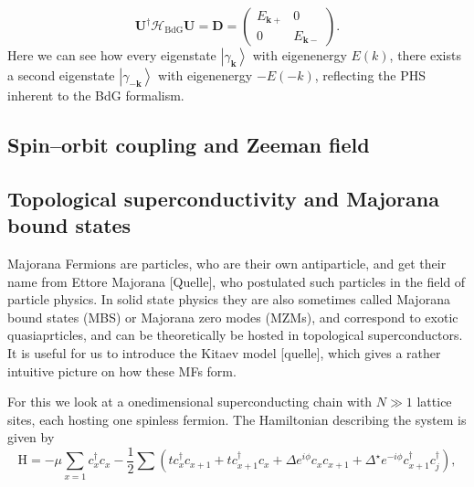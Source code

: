\begin{equation}
	\mathbf{U}^\dagger \mathcal{H}_\text{BdG} \mathbf{U} = \mathbf{D} = \scriptstyle{\begin{pmatrix} E_{\mathbf{k}+} & 0 \\ 0 & E_{\mathbf{k}-} \end{pmatrix}}.
	\label{eq:diagonal_bdg}
\end{equation}
Here we can see how every eigenstate $\left|\gamma_\mathbf{k} \right\rangle$ with eigenenergy $E(k)$, there exists a second eigenstate $\left| \gamma_{-\mathbf{k}} \right\rangle$ with eigenenergy $-E(-k)$, reflecting the PHS inherent to the BdG formalism. 

\subsection{Spin--orbit coupling and Zeeman field}
\label{sec:soc}

\subsection{Topological superconductivity and Majorana bound states}
\label{sec:topo}
Majorana Fermions are particles, who are their own antiparticle, and get their name from Ettore Majorana [Quelle], who postulated such particles in the field of particle physics. In solid state physics they are also sometimes called Majorana bound states (MBS) or Majorana zero modes (MZMs), and correspond to exotic quasiaprticles, and can be theoretically be hosted in topological superconductors. It is useful for us to introduce the Kitaev model [quelle], which gives a rather intuitive picture on how these MFs form. 

For this we look at a onedimensional superconducting chain with $N \gg 1$ lattice sites, each hosting one spinless fermion. The Hamiltonian describing the system is given by 
\begin{equation}
	\mathrm{H} = -\mu \sum_{x=1}c_x^{\dagger} c_x-\frac{1}{2} \sum\left(t c_x^{\dagger} c_{x+1}+t c_{x+1}^\dagger c_x+\Delta e^{i \phi} c_x c_{x+1}+ \Delta^\star e^{-i \phi} c_{x+1}^\dagger c_j^\dagger \right),
	\label{eq:kitaev_ham}
\end{equation}

